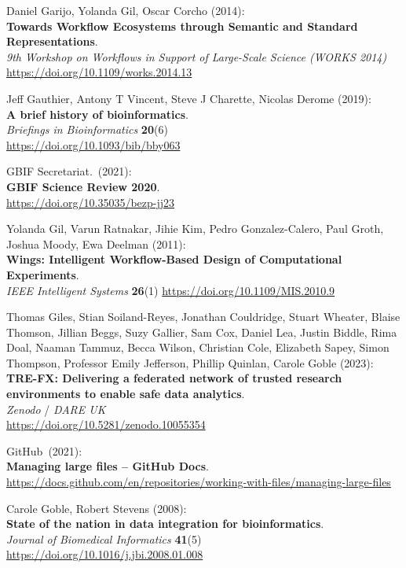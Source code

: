\begin{thebibliography}{9}
Daniel Garijo, Yolanda Gil, Oscar Corcho (2014):\\
\textbf{Towards Workflow Ecosystems through Semantic and Standard Representations}.\\
\emph{9th Workshop on Workflows in Support of Large-Scale Science (WORKS 2014)}\\
\url{https://doi.org/10.1109/works.2014.13} 

Jeff Gauthier, Antony T Vincent, Steve J Charette, Nicolas Derome (2019):\\
\textbf{A brief history of bioinformatics}.\\
\emph{Briefings in Bioinformatics} \textbf{20}(6)\\
\url{https://doi.org/10.1093/bib/bby063}

GBIF Secretariat.~(2021):\\
\textbf{GBIF Science Review 2020}.\\
\url{https://doi.org/10.35035/bezp-jj23}

Yolanda Gil, Varun Ratnakar, Jihie Kim, Pedro Gonzalez-Calero, Paul Groth, Joshua Moody, Ewa Deelman (2011):\\
\textbf{Wings: Intelligent Workflow-Based Design of Computational Experiments}.\\
\emph{IEEE Intelligent Systems} \textbf{26}(1)
\url{https://doi.org/10.1109/MIS.2010.9}

Thomas Giles, Stian Soiland-Reyes, Jonathan Couldridge, Stuart Wheater, Blaise Thomson, Jillian Beggs, Suzy Gallier, Sam Cox, Daniel Lea, Justin Biddle, Rima Doal, Naaman Tammuz, Becca Wilson, Christian Cole, Elizabeth Sapey, Simon Thompson, Professor Emily Jefferson, Phillip Quinlan, Carole Goble (2023):\\
\textbf{TRE-FX: Delivering a federated network of trusted research environments to enable safe data analytics}.\\
\emph{Zenodo} / \emph{DARE UK} \\
\url{https://doi.org/10.5281/zenodo.10055354}

GitHub~(2021):\\
\textbf{Managing large files -- GitHub Docs}.\\
\url{https://docs.github.com/en/repositories/working-with-files/managing-large-files}

Carole Goble, Robert Stevens (2008): \\
\textbf{State of the nation in data integration for bioinformatics}.\\
\emph{Journal of Biomedical Informatics} \textbf{41}(5) \\
\url{https://doi.org/10.1016/j.jbi.2008.01.008}


\end{thebibliography}
